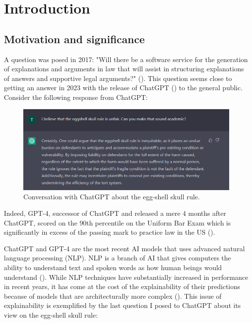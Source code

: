 
\chapter{Introduction} %

\label{chapter1} %

\section{Motivation and significance}
A question was posed in 2017: "Will there be a software service for the generation of explanations and arguments in law that will assist in structuring explanations of answers and supportive legal arguments?" (\cite{ashley_2017}). This question seems close to getting an answer in 2023 with the release of ChatGPT (\cite{openai}) to the general public. Consider the following response from ChatGPT:  

\begin{figure}[!ht]
	\centering
	\includegraphics[width=1\linewidth]{figures/chatgpt3.png}
	\caption{Conversation with ChatGPT about the egg-shell skull rule.}   
  \label{fig:chatgpt}
\end{figure}

Indeed, GPT-4, successor of ChatGPT and released a mere 4 months after ChatGPT, scored on the 90th percentile on the Uniform Bar Exam which is significantly in excess of the passing mark to practice law in the US (\cite{katz2023gpt}).

ChatGPT and GPT-4 are the most recent AI models that uses advanced natural language processing (NLP). NLP is a branch of AI that gives computers the ability to understand text and spoken words as how human beings would understand (\cite{ibm_nlp}). While NLP techniques have substantially increased in performance in recent years, it has come at the cost of the explainability of their predictions because of models that are architecturally more complex (\cite{zini2022}). This issue of explainability is exemplified by the last question I posed to ChatGPT about its view on the egg-shell skull rule:

